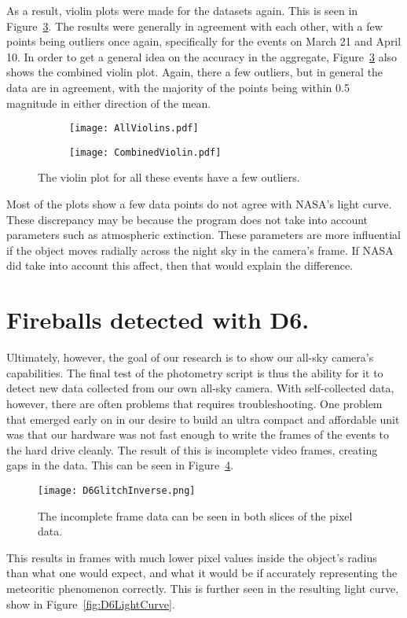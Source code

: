 As a result, violin plots were made for the datasets again. This is seen in Figure~\ref{fig:twoviolin}. The results were generally in agreement with each other, with a few points being outliers once again, specifically for the events on March 21 and April 10. In order to get a general idea on the accuracy in the aggregate, Figure~\ref{fig:twoviolin} also shows the combined violin plot. Again, there a few outliers, but in general the data are in agreement, with the majority of the points being within 0.5 magnitude in either direction of the mean.
\begin{figure}[ht!]
\centering
\begin{subfigure}{.5\textwidth}
	\centering
	\texttt{[image: AllViolins.pdf]}
	\label{fig:AllViolins}
\end{subfigure}%
\begin{subfigure}{.5\textwidth}
	\centering
	\texttt{[image: CombinedViolin.pdf]}
	\label{fig:CombinedViolin}
\end{subfigure}
\caption{The violin plot for all these events have a few outliers.}
\label{fig:twoviolin}
\end{figure}


Most of the plots show a few data points do not agree with NASA's light curve. These discrepancy may be because the program does not take into account parameters such as atmospheric extinction. These parameters are more influential if the object moves radially across the night sky in the camera's frame. If NASA did take into account this affect, then that would explain the difference. 

\section{Fireballs detected with D6.}

Ultimately, however, the goal of our research is to show our all-sky camera's capabilities. The final test of the photometry script is thus the ability for it to detect new data collected from our own all-sky camera. With self-collected data, however, there are often problems that requires troubleshooting. One problem that emerged early on in our desire to build an ultra compact and affordable unit was that our hardware was not fast enough to write the frames of the events to the hard drive cleanly. The result of this is incomplete video frames, creating gaps in the data. This can be seen in Figure~\ref{fig:D6Glitch}. 
\begin{figure}[ht!]
	\centering
	\texttt{[image: D6GlitchInverse.png]}
	\caption{The incomplete frame data can be seen in both slices of the pixel data.}
	\label{fig:D6Glitch}
\end{figure}
This results in frames with much lower pixel values inside the object's radius than what one would expect, and what it would be if accurately representing the meteoritic phenomenon correctly. This is further seen in the resulting light curve, show in Figure~\ref{fig:D6LightCurve}.

